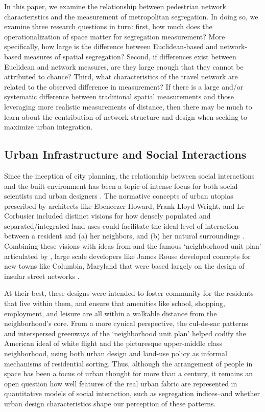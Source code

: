 \documentclass[
  10pt,
]{article}
\begin{document}
In this paper, we examine the relationship between pedestrian network
characteristics and the measurement of metropolitan segregation. In
doing so, we examine three research questions in turn: first, how much
does the operationalization of space matter for segregation measurement?
More specifically, how large is the difference between Euclidean-based
and network-based measures of spatial segregation? Second, if
differences exist between Euclidean and network measures, are they large
enough that they cannot be attributed to chance? Third, what
characteristics of the travel network are related to the observed
difference in measurement? If there is a large and/or systematic
difference between traditional spatial measurements and those leveraging
more realistic measurements of distance, then there may be much to learn
about the contribution of network structure and design when seeking to
maximize urban integration.

\hypertarget{urban-infrastructure-and-social-interactions}{%
\subsection{Urban Infrastructure and Social
Interactions}\label{urban-infrastructure-and-social-interactions}}

Since the inception of city planning, the relationship between social
interactions and the built environment has been a topic of intense focus
for both social scientists and urban designers
\citep{talen2017SocialScience}. The normative concepts of urban utopias
prescribed by architects like Ebeneezer Howard, Frank Lloyd Wright, and
Le Corbusier included distinct visions for how densely populated and
separated/integrated land uses could facilitate the ideal level of
interaction between a resident and (a) her neighbors, and (b) her
natural surroundings
\citep{howard2001GardenCities, lecorbusier1986NewArchitecture, campbell1996ReadingsPlanning}.
Combining these visions with ideas from \citet{wirth1938UrbanismWay} and
the famous `neighborhood unit plan' articulated by
\citet{perry1929neighborhood}, large scale developers like James Rouse
developed concepts for new towns like Columbia, Maryland that were based
largely on the design of insular street networks
\citep{olsen2003BetterPlaces}.

At their best, these designs were intended to foster community for the
residents that live within them, and ensure that amenities like school,
shopping, employment, and leisure are all within a walkable distance
from the neighborhood's core. From a more cynical perspective, the
cul-de-sac patterns and interspersed greenways of the `neighborhood unit
plan' helped codify the American ideal of white flight and the
picturesque upper-middle class neighborhood, using both urban design and
land-use policy as informal mechanisms of residential sorting. Thus,
although the arrangement of people in space has been a focus of urban
thought for more than a century, it remains an open question how well
features of the real urban fabric are represented in quantitative models
of social interaction, such as segregation indices--and whether urban
design characteristics shape our perception of these patterns.
\end{document}
